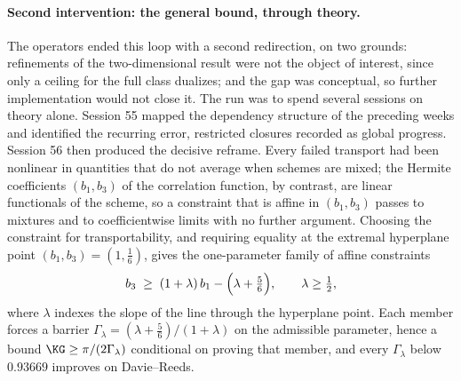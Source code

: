 \paragraph{Second intervention: the general bound, through theory.}
The operators ended this loop with a second redirection, on two grounds:
refinements of the two-dimensional result were not the object of interest,
since only a ceiling for the full class dualizes; and the gap was
conceptual, so further implementation would not close it. The run was to
spend several sessions on theory alone. Session 55 mapped the dependency
structure of the preceding weeks and identified the recurring error,
restricted closures recorded as global progress. Session 56 then produced
the 
decisive reframe. Every failed transport had been nonlinear in
quantities that do not average when schemes are mixed; the Hermite
coefficients $(b_1,b_3)$ of the correlation function, by contrast, are
linear functionals of the scheme, so a constraint that is affine in
$(b_1,b_3)$ passes to mixtures and to coefficientwise limits with no further
argument. Choosing the constraint for transportability, and requiring
equality at the extremal hyperplane point $(b_1,b_3)=(1,\tfrac16)$, gives
the one-parameter family of affine constraints
\[
        b_3\;\ge\;(1+\lambda)\,b_1-\Bigl(\lambda+\tfrac56\Bigr),
        \qquad \lambda\ge\tfrac12 ,
\]
where $\lambda$ indexes the slope of the line through the hyperplane point.
Each member forces a barrier $\Gamma_\lambda=(\lambda+\frac56)/(1+\lambda)$
on the admissible parameter, hence a bound $\KG\ge\pi/(2\Gamma_\lambda)$
conditional on proving that member, and every $\Gamma_\lambda$ below
$0.93669$ improves on Davie--Reeds.

